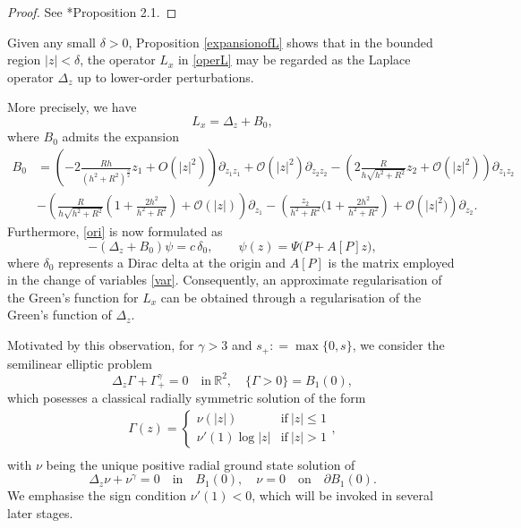 \documentclass[11pt,reqno,a4paper]{amsart}
\numberwithin{equation}{section}
\newcommand{\defeq}{\mathrel{\mathop:}=}
\begin{document}
\begin{proof}
See \cite{MR4899797}*{Proposition 2.1}.
\end{proof}

Given any small $\delta>0$, Proposition \ref{expansionofL} shows that in the bounded region $|z|<\delta$, the operator $L_x$ in \eqref{operL} may be regarded as the Laplace operator $\Delta_z$ up to lower-order perturbations. 

More precisely, we have
\begin{equation}\label{oper}
L_x=\Delta_z+B_{0},
\end{equation}
where $B_{0}$ admits the expansion 
\begin{equation}
\begin{aligned}\nonumber
B_0
&= \left(-2\frac{Rh}{(h^2+R^2)^{\frac 3 2}}z_1+O(|z|^2)\right)\partial_{z_1z_1}
+\mathcal{O}(|z|^2)\partial_{z_2z_2} -\left(2\frac {R}{h\sqrt{h^2+R^2}}z_2+\mathcal{O}(|z|^2)\right)\partial_{z_1z_2}  \nonumber \\
&-\left(\frac{R}{h\sqrt{h^2+R^2}}\left(1+\frac{2h^2}{h^2+R^2}\right)+\mathcal{O}(|z|)\right)
\partial_{z_1} -\left(\frac{z_2}{h^2+R^2}\Big(1+\frac{2h^2}{h^2+R^2}\right)
+\mathcal{O}\left(|z|^2)\right)
\partial_{z_2}.
\end{aligned}
\end{equation}
Furthermore, \eqref{ori} is now formulated as
\begin{equation}\label{oriz}
-(\Delta_z+B_0)\psi = c\,\delta_{0}, 
\qquad 
\psi(z)=\Psi\bigl(P+A[P]z\bigr),
\end{equation}
where $\delta_{0}$ represents a Dirac delta at the origin and $A[P]$ is the matrix employed in the change of variables \eqref{var}. Consequently, an approximate regularisation of the Green’s function for $L_x$ can be obtained through a regularisation of the Green's function of $\Delta_z$. 

Motivated by this observation, for $\gamma>3$ and $s_{+}\defeq\max\{0,s\}$, we consider the semilinear elliptic problem
\begin{equation}\label{modelsemil}
\Delta_z\Gamma + \Gamma_+^\gamma=0 \quad \mbox{in}\ \mathbb{R}^2,
\quad \{\Gamma>0\}= B_1(0),
\end{equation}
which posesses a classical radially symmetric solution of the form
\begin{equation}\label{defGamma}
\begin{aligned}
\Gamma(z)
  =
\left\{\begin{array}{ll}
\nu(|z|)&\mathrm{if~}|z|\leq1\\
\nu'(1)\log|z|&\mathrm{if~}|z|>1
\end{array}
\right.,\\
\end{aligned}
\end{equation}
 with $\nu$ being the unique positive radial ground state solution of
 \[
 \Delta_z
 \nu+\nu^\gamma =0 \quad \text{in} \quad B_1(0), \quad \nu=0 \quad \text{on} \quad \partial B_1(0).
 \]
We emphasise the sign condition $\nu'(1)<0$, which will be invoked in several later stages. 
\end{document}
